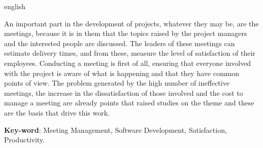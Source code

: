 \begin{resumo}[Abstract]
 \begin{otherlanguage*}{english}

  An important part in the development of projects, whatever they may be, are the meetings, because it is in them that the topics raised by the project managers and the interested people are discussed. The leaders of these meetings can estimate delivery times, and from these, measure the level of satisfaction of their employees. Conducting a meeting is first of all, ensuring that everyone involved with the project is aware of what is happening and that they have common points of view. The problem generated by the high number of ineffective meetings, the increase in the dissatisfaction of those involved and the cost to manage a meeting are already points that raised studies on the theme and these are the basis that drive this work.

   \vspace{\onelineskip}

   \noindent
   \textbf{Key-word}: Meeting Management, Software Development, Satisfaction, Productivity.
 \end{otherlanguage*}
\end{resumo}

